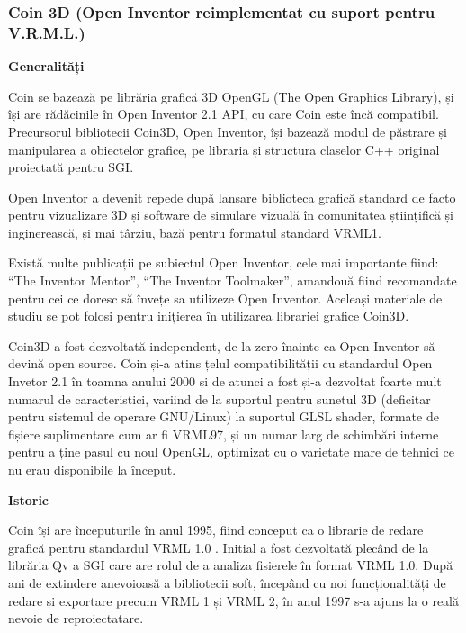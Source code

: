 \subsubsection{Coin 3D (Open Inventor reimplementat cu suport pentru V.R.M.L.)}
\par \textbf{Generalități}
\par Coin se bazează pe librăria grafică 3D OpenGL (The Open Graphics Library), și își are rădăcinile în Open Inventor 2.1 API, cu care Coin este încă compatibil. Precursorul bibliotecii Coin3D, Open Inventor, își bazează modul de păstrare și manipularea a obiectelor grafice, pe libraria și structura claselor C++ original proiectată pentru SGI.\cite{C04}
\par Open Inventor a devenit repede după lansare biblioteca grafică standard de facto pentru vizualizare 3D și software de simulare vizuală în comunitatea științifică și inginerească, și mai târziu, bază pentru formatul standard VRML1. 
\par Există multe publicații pe subiectul Open Inventor, cele mai importante fiind: “The Inventor Mentor”, “The Inventor Toolmaker”, amandouă fiind recomandate pentru cei ce doresc să învețe sa utilizeze Open Inventor. Aceleași materiale de studiu se pot folosi pentru inițierea în utilizarea librariei grafice Coin3D.\cite{C04}
\par Coin3D a fost dezvoltată independent, de la zero înainte ca Open Inventor să devină open source. Coin și-a atins țelul compatibilității cu standardul Open Invetor 2.1 în toamna anului 2000 și de atunci a fost și-a dezvoltat foarte mult numarul de caracteristici, variind de la suportul pentru sunetul 3D (deficitar pentru sistemul de operare GNU/Linux) la suportul GLSL shader, formate de fișiere suplimentare cum ar fi VRML97, și un numar larg de schimbări interne pentru a ține pasul cu noul OpenGL, optimizat cu o varietate mare de tehnici ce nu erau disponibile la început.\cite{C04} 
\par \textbf{Istoric}
\par Coin își are începuturile în anul 1995, fiind conceput ca o librarie de redare grafică pentru standardul VRML 1.0 . Initial a fost dezvoltată plecând de la librăria Qv a SGI care are rolul de a analiza fisierele în format VRML 1.0. După ani de extindere anevoioasă a bibliotecii soft, începând cu noi funcționalități de redare și exportare precum VRML 1 și VRML 2, în anul 1997 s-a ajuns la o reală nevoie de reproiectatare.\cite{C04}
